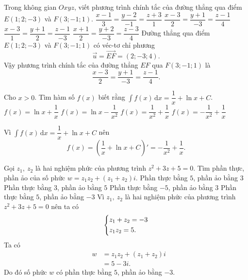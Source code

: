 \begin{ex}%
	Trong không gian $Oxyz$, viết phương trình chính tắc của đường thẳng qua điểm $E(1;2;-3)$ và $F(3;-1;1)$.
	\choice
	{$\dfrac{x-1}{3}=\dfrac{y-2}{-1}=\dfrac{z+3}{1}$}
	{\True $\dfrac{x-3}{2}=\dfrac{y+1}{-3}=\dfrac{z-1}{4}$}
	{$\dfrac{x-3}{1}=\dfrac{y+1}{2}=\dfrac{z-1}{-3}$}
	{$\dfrac{x+1}{2}=\dfrac{y+2}{-3}=\dfrac{z-3}{4}$}
	\loigiai
	{
		Đường thẳng qua điểm $E(1;2;-3)$ và $F(3;-1;1)$ có véc-tơ chỉ phương
		\[\vec{u}=\vec{EF}=(2;-3;4).\]
		Vậy phương trình chính tắc của đường thẳng $EF$ qua $F(3;-1;1)$ là
		\[\dfrac{x-3}{2}=\dfrac{y+1}{-3}=\dfrac{z-1}{4}.\]
		\vspace{-3ex}
	}
\end{ex}

\begin{ex}%
	Cho $x>0$. Tìm hàm số $f(x)$ biết rằng $\displaystyle\int f(x)\mathrm{\,d}x=\dfrac{1}{x}+\ln x+C$.
	\choice
	{$f(x)=\ln x+\dfrac{1}{x}$}
	{$f(x)=\ln x-\dfrac{1}{x^2}$}
	{$f(x)=\dfrac{1}{x^2}+\dfrac{1}{x}$}
	{\True $f(x)=-\dfrac{1}{x^2}+\dfrac{1}{x}$}
	\loigiai
	{
		Vì $\displaystyle\int f(x)\mathrm{\,d}x=\dfrac{1}{x}+\ln x+C$ nên
		\[f(x)=\left(\dfrac{1}{x}+\ln x+C\right)'=-\dfrac{1}{x^2}+\dfrac{1}{x}.\]
		
	}
\end{ex}

\begin{ex}%
	Gọi $z_1,~z_2$ là hai nghiệm phức của phương trình $z^2+3z+5=0$. Tìm phần thực, phần ảo của số phức $w=z_1z_2+(z_1+z_2)i$.
	\choice
	{Phần thực bằng $5$, phần ảo bằng $3$}
	{Phần thực bằng $3$, phần ảo bằng $5$}
	{Phần thực bằng $-5$, phần ảo bằng $3$}
	{\True Phần thực bằng $5$, phần ảo bằng $-3$}
	\loigiai
	{
		Vì $z_1,~z_2$ là hai nghiệm phức của phương trình $z^2+3z+5=0$ nên ta có
		\[\left\{\begin{aligned}&z_1+z_2=-3\\&z_1z_2=5.\end{aligned}\right.\]
		Ta có
		\begin{eqnarray*}
			& w&=z_1z_2+(z_1+z_2)i \\
			&  &=5-3i.
		\end{eqnarray*}
	Do đó số phức $w$ có phần thực bằng $5$, phần ảo bằng $-3$.
	}
\end{ex}

